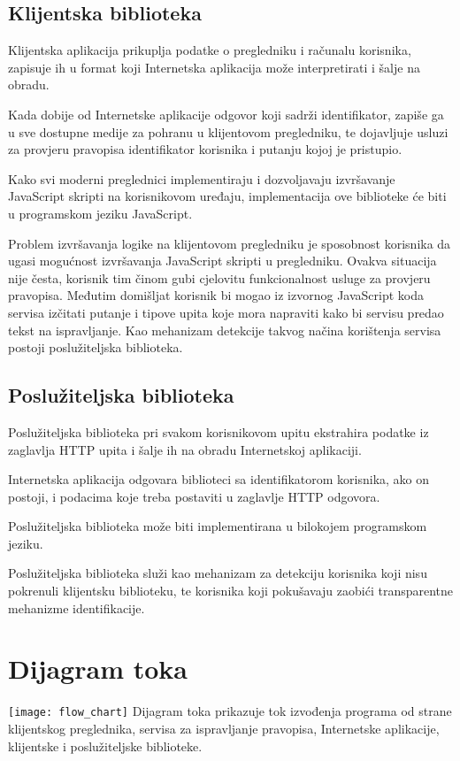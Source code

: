 \documentclass[times, utf8, zavrsni]{fer}
\begin{document}
\subsection{Klijentska biblioteka}
Klijentska aplikacija prikuplja podatke o pregledniku i računalu korisnika,
zapisuje ih u format koji Internetska aplikacija može interpretirati i šalje na
obradu.

Kada dobije od Internetske aplikacije odgovor koji sadrži identifikator,
zapiše ga u sve dostupne medije za pohranu u klijentovom pregledniku, te
dojavljuje usluzi za provjeru pravopisa identifikator korisnika i putanju kojoj
je pristupio.

Kako svi moderni preglednici implementiraju i dozvoljavaju izvršavanje
JavaScript skripti na korisnikovom uređaju, implementacija ove biblioteke će
biti u programskom jeziku JavaScript.

Problem izvršavanja logike na klijentovom pregledniku je sposobnost korisnika
da ugasi mogućnost izvršavanja JavaScript skripti u pregledniku. Ovakva
situacija nije česta, korisnik tim činom gubi cjelovitu funkcionalnost
usluge za provjeru pravopisa. Međutim domišljat korisnik bi mogao iz izvornog
JavaScript koda servisa izčitati putanje i tipove upita koje mora napraviti kako
bi servisu predao tekst na ispravljanje. Kao mehanizam detekcije takvog načina
korištenja servisa postoji poslužiteljska biblioteka.

\subsection{Poslužiteljska biblioteka}
Poslužiteljska biblioteka pri svakom korisnikovom upitu ekstrahira podatke iz
zaglavlja HTTP upita i šalje ih na obradu Internetskoj aplikaciji.

Internetska aplikacija odgovara biblioteci sa identifikatorom korisnika, ako
on postoji, i podacima koje treba postaviti u zaglavlje HTTP odgovora.

Poslužiteljska biblioteka može biti implementirana u bilokojem programskom
jeziku.

Poslužiteljska biblioteka služi kao mehanizam za detekciju korisnika koji nisu
pokrenuli klijentsku biblioteku, te korisnika koji pokušavaju zaobići
transparentne mehanizme identifikacije.

\section{Dijagram toka}
\texttt{[image: flow\_chart]}
Dijagram toka prikazuje tok izvođenja programa od strane klijentskog
preglednika, servisa za ispravljanje pravopisa, Internetske aplikacije,
klijentske i poslužiteljske biblioteke.
\end{document}
